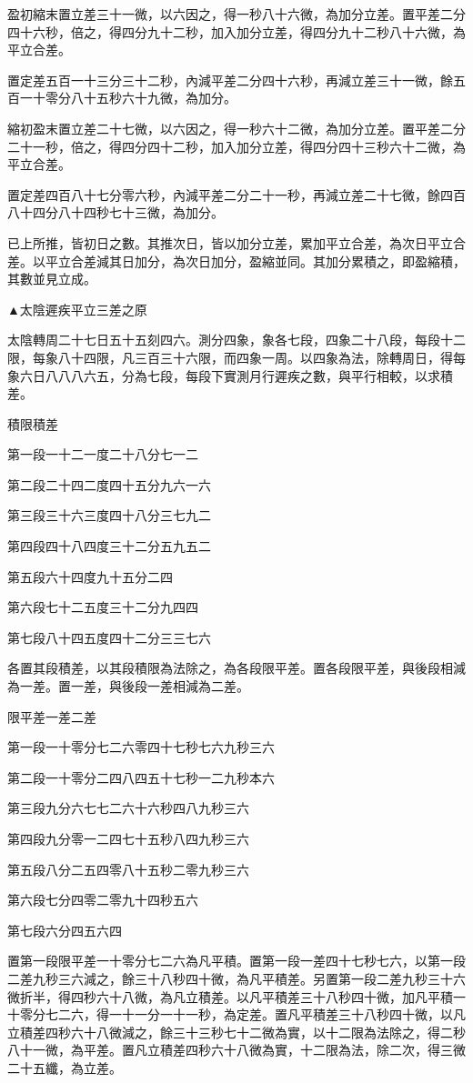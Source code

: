 盈初縮末置立差三十一微，以六因之，得一秒八十六微，為加分立差。置平差二分四十六秒，倍之，得四分九十二秒，加入加分立差，得四分九十二秒八十六微，為平立合差。

置定差五百一十三分三十二秒，內減平差二分四十六秒，再減立差三十一微，餘五百一十零分八十五秒六十九微，為加分。

縮初盈末置立差二十七微，以六因之，得一秒六十二微，為加分立差。置平差二分二十一秒，倍之，得四分四十二秒，加入加分立差，得四分四十三秒六十二微，為平立合差。

置定差四百八十七分零六秒，內減平差二分二十一秒，再減立差二十七微，餘四百八十四分八十四秒七十三微，為加分。

已上所推，皆初日之數。其推次日，皆以加分立差，累加平立合差，為次日平立合差。以平立合差減其日加分，為次日加分，盈縮並同。其加分累積之，即盈縮積，其數並見立成。

▲太陰遲疾平立三差之原

太陰轉周二十七日五十五刻四六。測分四象，象各七段，四象二十八段，每段十二限，每象八十四限，凡三百三十六限，而四象一周。以四象為法，除轉周日，得每象六日八八八六五，分為七段，每段下實測月行遲疾之數，與平行相較，以求積差。

積限積差

第一段一十二一度二十八分七一二

第二段二十四二度四十五分九六一六

第三段三十六三度四十八分三七九二

第四段四十八四度三十二分五九五二

第五段六十四度九十五分二四

第六段七十二五度三十二分九四四

第七段八十四五度四十二分三三七六

各置其段積差，以其段積限為法除之，為各段限平差。置各段限平差，與後段相減為一差。置一差，與後段一差相減為二差。

限平差一差二差

第一段一十零分七二六零四十七秒七六九秒三六

第二段一十零分二四八四五十七秒一二九秒本六

第三段九分六七七二六十六秒四八九秒三六

第四段九分零一二四七十五秒八四九秒三六

第五段八分二五四零八十五秒二零九秒三六

第六段七分四零二零九十四秒五六

第七段六分四五六四

置第一段限平差一十零分七二六為凡平積。置第一段一差四十七秒七六，以第一段二差九秒三六減之，餘三十八秒四十微，為凡平積差。另置第一段二差九秒三十六微折半，得四秒六十八微，為凡立積差。以凡平積差三十八秒四十微，加凡平積一十零分七二六，得一十一分一十一秒，為定差。置凡平積差三十八秒四十微，以凡立積差四秒六十八微減之，餘三十三秒七十二微為實，以十二限為法除之，得二秒八十一微，為平差。置凡立積差四秒六十八微為實，十二限為法，除二次，得三微二十五纖，為立差。

